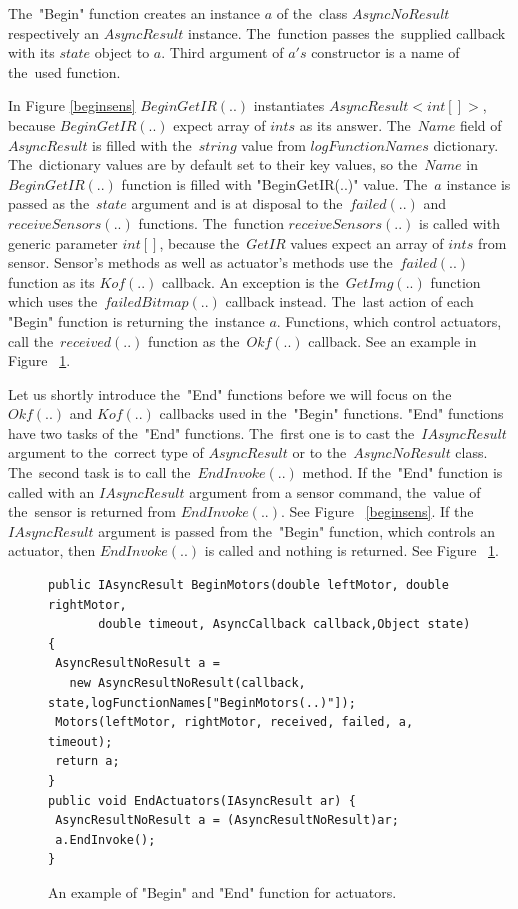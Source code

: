   The~"Begin" function creates an instance $a$ of the~class $AsyncNoResult$ respectively an $AsyncResult$ instance. 
  The~function passes the~supplied callback with its $state$ object to
  $a$. Third argument of $a's$ constructor is a name of the~used function.

  In Figure \ref{beginsens}  $BeginGetIR(..)$ instantiates $AsyncResult<int[]>$, because $BeginGetIR(..)$
  expect array of $ints$ as its answer. 
  The~$Name$ field of $AsyncResult$ is filled with the~$string$ value from $logFunctionNames$ dictionary. 
  The~dictionary values are by default set to their key values, so
  the~$Name$ in $BeginGetIR(..)$ function is filled with "BeginGetIR(..)" value.
  The~$a$ instance is passed as the~$state$ argument and is at disposal to the~$failed(..)$ and 
  $receiveSensors(..)$ functions.
  The~function $receiveSensors(..)$ is called with generic parameter $int[]$, 
  because the~$GetIR$ values expect an array of $ints$ from sensor.
  Sensor's methods as well as actuator's methods use the~$failed(..)$ function as its $Kof(..)$ callback.
  An exception is the~$GetImg(..)$ function which uses the~$failedBitmap(..)$ callback instead.
  The~last action of each "Begin" function is returning the~instance $a$.
  Functions, which control actuators, call the~$received(..)$ function as the~$Okf(..)$ callback. 
  See an example in Figure ~\ref{beginact}.

  Let us shortly introduce the~"End" functions before we will focus on the~$Okf(..)$ and 
  $Kof(..)$ callbacks used in the~"Begin" functions.
  "End" functions have two tasks of the~"End" functions.
  The~first one is to cast the~$IAsyncResult$ argument to the~correct type of $AsyncResult$ 
  or to the~$AsyncNoResult$ class. The~second task is to call the~$EndInvoke(..)$ method.
  If the~"End" function is called with an $IAsyncResult$ argument from a sensor command, 
  the~value of the~sensor is returned from $EndInvoke(..)$. See Figure ~\ref{beginsens}. 
  If the~$IAsyncResult$ argument is passed from the~"Begin" function, 
  which controls an actuator, then $EndInvoke(..)$ is called and nothing is returned. See Figure ~\ref{beginact}.
  
\begin{figure}[!hbp]
\begin{lstlisting}
public IAsyncResult BeginMotors(double leftMotor, double rightMotor, 
       double timeout, AsyncCallback callback,Object state) {
 AsyncResultNoResult a = 
   new AsyncResultNoResult(callback, state,logFunctionNames["BeginMotors(..)"]);
 Motors(leftMotor, rightMotor, received, failed, a, timeout);
 return a;
}
public void EndActuators(IAsyncResult ar) {
 AsyncResultNoResult a = (AsyncResultNoResult)ar;
 a.EndInvoke();
}
\end{lstlisting}	
\caption{An example of "Begin" and "End" function for actuators.} \label{beginact}
\end{figure}
 
